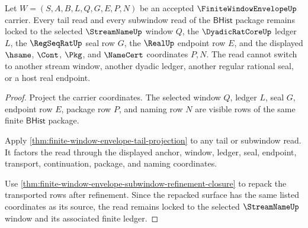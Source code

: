 \begin{theorem}
\label{thm:finite-window-envelope-streamname-tail-lock}
Let $W=(S,A,B,L,Q,G,E,P,N)$ be an accepted $\FiniteWindowEnvelopeUp$ carrier. Every tail read and every subwindow read of the $\mathsf{BHist}$ package remains locked to the selected $\StreamNameUp$ window $Q$, the $\DyadicRatCoreUp$ ledger $L$, the $\RegSeqRatUp$ seal row $G$, the $\RealUp$ endpoint row $E$, and the displayed $\hsame$, $\Cont$, $\Pkg$, and $\NameCert$ coordinates $P,N$. The read cannot switch to another stream window, another dyadic ledger, another regular rational seal, or a host real endpoint.
\end{theorem}
\begin{proof}
Project the carrier coordinates. The selected window $Q$, ledger $L$, seal $G$, endpoint row $E$, package row $P$, and naming row $N$ are visible rows of the same finite $\mathsf{BHist}$ package.

Apply \autoref{thm:finite-window-envelope-tail-projection} to any tail or subwindow read. It factors the read through the displayed anchor, window, ledger, seal, endpoint, transport, continuation, package, and naming coordinates.

Use \autoref{thm:finite-window-envelope-subwindow-refinement-closure} to repack the transported rows after refinement. Since the repacked surface has the same listed coordinates as its source, the read remains locked to the selected $\StreamNameUp$ window and its associated finite ledger.
\end{proof}

